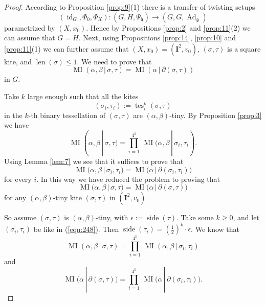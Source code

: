\documentclass[10pt, a4paper]{amsart}
\theoremstyle{definition}
\numberwithin{equation}{section}
\newcommand{\opn}{\operatorname}
\newcommand{\mfrak}[1]{\mathfrak{#1}}
\newcommand{\mbf}[1]{\mathbf{#1}}
\newcommand{\smfrac}[2]{{\textstyle \frac{#1}{#2}}}
\renewcommand{\vert}{\, | \,}
\newcommand{\g}{\mfrak{g}}
\newcommand{\h}{\mfrak{h}}
\begin{document}
\begin{proof}
According to Proposition \ref{prop:9}(1) there is a transfer of
twisting setups
\[ (\opn{id}_G, \Phi_0, \Phi_X) :
(G, H, \Psi_{\h}) \to (G, G, \opn{Ad}_{\g}) \]
parametrized by $(X, x_0)$. Hence by Propositions \ref{prop:2} and
\ref{prop:11}(2) we can assume that $G = H$. 
Next, using Propositions \ref{prop:14}, \ref{prop:10} and \ref{prop:11}(1)
we can further assume that 
$(X, x_0) = (\mbf{I}^2, v_0)$, $(\sigma, \tau)$ is a square kite, and
$\opn{len}(\sigma) \leq 1$. We need to prove that 
\begin{equation}
\opn{MI} (\alpha, \beta \vert \sigma, \tau) = 
\opn{MI} (\alpha \vert \partial (\sigma, \tau))  
\end{equation}
in $G$.

Take $k$ large enough such that all the kites 
\begin{equation} \label{eqn:248}
(\sigma_i, \tau_i) := \opn{tes}^k_i (\sigma, \tau)
\end{equation}
in the $k$-th binary tessellation of $(\sigma, \tau)$ are 
$(\alpha, \beta)$-tiny. By Proposition \ref{prop:3} we have
\[ \opn{MI} (\alpha, \beta \vert \sigma, \tau) = 
\prod_{i = 1}^{4^k} \, 
\opn{MI} \bigl( \alpha, \beta \vert \sigma_i, \tau_i) . \]
Using Lemma \ref{lem:7} we see that it suffices to prove that 
\[ \opn{MI} \bigl( \alpha, \beta \vert \sigma_i, \tau_i) =
\opn{MI} \bigl( \alpha \vert \partial(\sigma_i, \tau_i) \bigr) \]
for every $i$. In this way we have reduced the problem to proving that 
\begin{equation} \label{eqn:29}
\opn{MI} (\alpha, \beta \vert \sigma, \tau) =
\opn{MI} \bigl( \alpha \vert \partial(\sigma, \tau) \bigr) 
\end{equation}
for any $(\alpha, \beta)$-tiny kite $(\sigma, \tau)$ in 
$(\mbf{I}^2, v_0)$.

So assume $(\sigma, \tau)$ is $(\alpha, \beta)$-tiny, with
$\epsilon := \opn{side}(\tau)$. Take some $k \geq 0$,
and let $(\sigma_i, \tau_i)$ be like in (\ref{eqn:248}). Then 
$\opn{side}(\tau_i) = (\smfrac{1}{2})^k \cdot \epsilon$.
We know that
\begin{equation} \label{eqn:30} 
\opn{MI} (\alpha, \beta \vert \sigma, \tau) =
\prod_{i = 1}^{4^k} \, 
\opn{MI} ( \alpha, \beta \vert \sigma_i, \tau_i)  
\end{equation}
and
\begin{equation} \label{eqn:31} 
\opn{MI} \bigl( \alpha \vert \partial  (\sigma, \tau) \bigr) = 
\prod_{i = 1}^{4^k} \, 
\opn{MI} \bigl( \alpha \vert \partial(\sigma_i, \tau_i) \bigr) . 
\end{equation}


\end{proof}
\end{document}
